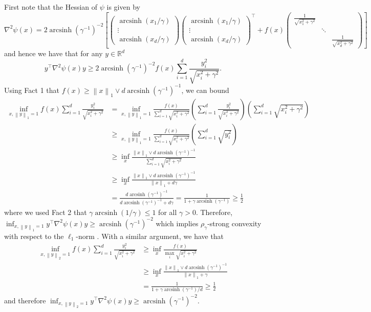 \documentclass[a4paper]{article}
\newcommand{\pr}[1]{\left(#1\right)}
\newcommand{\br}[1]{\left[#1\right]}
\newcommand{\norm}[1]{\left\|#1\right\|}
\newcommand{\RR}[0]{\mathbb{R}}
\DeclareMathOperator{\arcsinh}{arcsinh}
\theoremstyle{thmstyle}
\theoremstyle{defstyle}
\theoremstyle{remark}
\begin{document}
First note that the Hessian of $\psi$ is given by
\begin{equation*}
    \nabla^2 \psi(x)=2\arcsinh(\gamma^{-1})^{-2}\br{
    \begin{pmatrix}
        \arcsinh(x_1/\gamma)\\
        \vdots \\
        \arcsinh(x_d/\gamma)
    \end{pmatrix}
    \begin{pmatrix}
        \arcsinh(x_1/\gamma)\\
        \vdots \\
        \arcsinh(x_d/\gamma)
    \end{pmatrix}^\top
    +f(x)
    \begin{pmatrix}
        \frac{1}{\sqrt{x_1^2+\gamma^2}} & & \\
        & \ddots & \\
        & & \frac{1}{\sqrt{x_d^2+\gamma^2}}
    \end{pmatrix}
    } 
\end{equation*} 
and hence we have that for any $y\in\RR^d$
\begin{equation*}
    y^\top \nabla^2\psi(x)y \geq 2\arcsinh(\gamma^{-1})^{-2} f(x)\sum_{i=1}^d \frac{y_i^2}{\sqrt{x_i^2+\gamma^2}}.
\end{equation*}
Using Fact 1 that $f(x)\geq \norm{x}_1 \vee d\arcsinh(\gamma^{-1})^{-1}$, we can bound
\begin{align*}
    \inf_{x,\norm{y}_1=1}f(x)\sum_{i=1}^d \frac{y_i^2}{\sqrt{x_i^2+\gamma^2}}&=\inf_{x,\norm{y}_1=1}\frac{f(x)}{\sum_{i=1}^d\sqrt{x_i^2+\gamma^2}}\pr{\sum_{i=1}^d \frac{y_i^2}{\sqrt{x_i^2+\gamma^2}}}\pr{\sum_{i=1}^d\sqrt{x_i^2+\gamma^2}} \\
    &\geq \inf_{x,\norm{y}_1=1} \frac{f(x)}{\sum_{i=1}^d\sqrt{x_i^2+\gamma^2}}\pr{\sum_{i=1}^d \sqrt{y_i^2}}\\
    &\geq \inf_{x} \frac{\norm{x}_1\vee d\arcsinh(\gamma^{-1})^{-1}}{\sum_{i=1}^d\sqrt{x_i^2+\gamma^2}} \\
    &\geq \inf_x \frac{\norm{x}_1\vee d\arcsinh(\gamma^{-1})^{-1}}{\norm{x}_1+d\gamma}\\
    &=\frac{ d\arcsinh(\gamma^{-1})^{-1}}{d\arcsinh(\gamma^{-1})^{-1}+d\gamma} =\frac{1}{1+\gamma \arcsinh(\gamma^{-1})} \geq  \frac{1}{2}
\end{align*}
where we used Fact 2 that $\gamma \arcsinh(1/\gamma)\leq 1$ for all $\gamma>0$. Therefore, $\inf_{x,\norm{y}_1=1} y^\top \nabla^2\psi(x)y \geq \arcsinh(\gamma^{-1})^{-2}$
which implies $\rho_\gamma$-strong convexity with respect to the $\ell_1$-norm \citep[Theorem 3]{Yu2015strongconvexity}.
With a similar argument, we have that
\begin{align*}
    \inf_{x,\norm{y}_2=1}f(x)\sum_{i=1}^d \frac{y_i^2}{\sqrt{x_i^2+\gamma^2}}&\geq \inf_{x}\frac{f(x)}{\max_i\sqrt{x_i^2+\gamma^2}} \\
    &\geq \inf_{x}\frac{\norm{x}_1\vee d\arcsinh(\gamma^{-1})^{-1}}{\norm{x}_1+\gamma} \\
    &=\frac{1}{1+\gamma \arcsinh(\gamma^{-1})/d} \geq \frac{1}{2}
\end{align*}
and therefore $\inf_{x,\norm{y}_2=1} y^\top \nabla^2\psi(x)y \geq \arcsinh(\gamma^{-1})^{-2}$.
\end{document}

